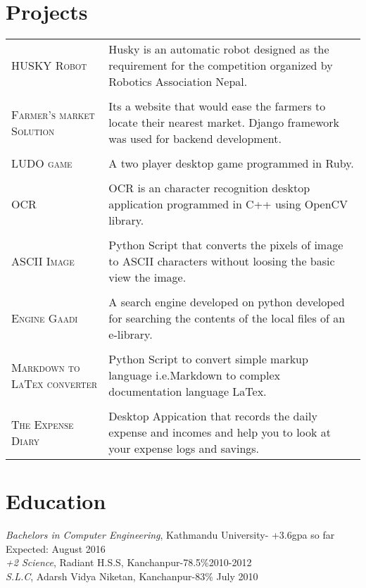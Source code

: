 \documentclass[letter]{res}
\begin{document}
\begin{resume}
\section{Projects}
\begin{tabular}{p{4cm}|p{11.6cm}}
\textsc{HUSKY Robot} & \small{Husky is an automatic robot designed as the requirement for the competition organized by Robotics Association Nepal.}
\\\multicolumn{2}{c}{} \\

\textsc{Farmer's market Solution} & \small{Its a website that would ease the farmers to locate their nearest market. Django framework was used for backend development.}
\\\multicolumn{2}{c}{} \\

\textsc{LUDO game} &  \small{A two player desktop game programmed in Ruby.}
\\\multicolumn{2}{c}{} \\

\textsc{OCR} & \small{OCR is an character recognition desktop application programmed in C++ using OpenCV library.}
\\\multicolumn{2}{c}{} \\

\textsc{ASCII Image} & \small{Python Script that converts the pixels of image to ASCII characters without loosing the basic view the image.}
\\\multicolumn{2}{c}{} \\

\textsc{Engine Gaadi} & \small{A search engine developed on python developed for searching the contents of the local files of an e-library.}
\\\multicolumn{2}{c}{} \\

\textsc{Markdown to LaTex converter}&\small{Python Script to convert simple markup language i.e.Markdown to complex documentation language LaTex.}
\\\multicolumn{2}{c}{} \\

 \textsc{The Expense Diary} & \small{Desktop Appication that records the daily expense and incomes and help you to look at your expense logs and savings.}
\end{tabular}

\newpage
\section{Education}
{\sl Bachelors in Computer Engineering}, Kathmandu University- +3.6gpa so far \hfill Expected: August 2016\\
{\sl +2 Science}, Radiant H.S.S, Kanchanpur-78.5\%\hfill 2010-2012 \\
{\sl S.L.C}, Adarsh Vidya Niketan, Kanchanpur-83\% \hfill July 2010 \\
  \vspace{-2mm}
  

\end{resume}
\end{document}
